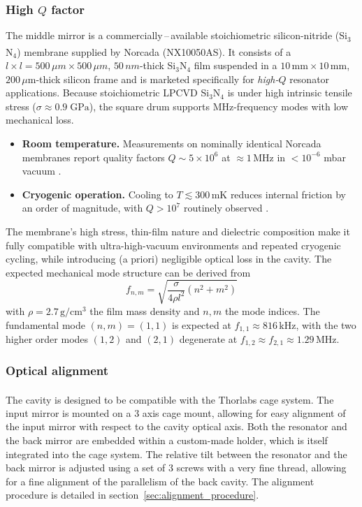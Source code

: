 \subsubsection{High $Q$ factor}

The middle mirror is a commercially\,–\,available stoichiometric silicon-nitride
(Si$_3$N$_4$) membrane supplied by Norcada\textsuperscript{\textregistered} (NX10050AS)\cite{SiN_review,Norcada_datasheet}.
It consists of a $l \times l = 500\,\mu m\times500\,\mu m $, $50\,nm$-thick
Si$_3$N$_4$ film suspended in a $10\,\mathrm{mm}\times10\,\mathrm{mm}$,
$200\,\mu\mathrm{m}$-thick silicon frame and is marketed specifically for
\emph{high-$Q$} resonator applications. Because stoichiometric LPCVD Si$_3$N$_4$ is under high intrinsic tensile
stress ($\sigma\!\approx\!0.9\;\mathrm{GPa}$), the square drum supports
MHz-frequency modes with low mechanical loss\cite{SiN_review}.

\begin{itemize}
  \item \textbf{Room temperature.}  Measurements on nominally identical
        Norcada membranes report quality factors
        $Q \sim 5\times10^{6}$ at $\approx1\,\mathrm{MHz}$ in
        $<10^{-6}$ mbar vacuum \cite{SiN_review,Norcada_datasheet}.
  \item \textbf{Cryogenic operation.}  Cooling to $T \lesssim 300\,\mathrm{mK}$
        reduces internal friction by an order of magnitude, with
        $Q>10^{7}$ routinely observed \cite{SiN_cryogenic}.
\end{itemize}

The membrane’s high stress, thin-film nature and dielectric composition make
it fully compatible with ultra-high-vacuum environments and repeated
cryogenic cycling, while introducing (a priori) negligible optical loss in the cavity.
The expected mechanical mode structure can be derived from 
\begin{equation}
f_{n,m}= \sqrt{\dfrac{\sigma}{4\rho l^2}(n^2+m^2)}
\end{equation}
with $\rho= 2.7 \,\mathrm{g/cm^3}$ the film mass density and $n,m$ the mode indices. The fundamental mode $(n,m)=(1,1)$ is expected at $f_{1,1} \approx 816\,\mathrm{kHz}$, with the two higher order modes $(1,2)$ and $(2,1)$ degenerate at $f_{1,2}\approx f_{2,1} \approx 1.29\,\mathrm{MHz}$.

\subsubsection{Optical alignment}
The cavity is designed to be compatible with the Thorlabs\textsuperscript{\textregistered} cage system. The input mirror is mounted on a 3 axis cage mount, allowing for easy alignment of the input mirror with respect to the cavity optical axis. Both the resonator and the back mirror are embedded within a custom-made holder, which is itself integrated into the cage system. The relative tilt between the resonator and the back mirror is adjusted using a set of 3 screws with a very fine thread, allowing for a fine alignment of the parallelism of the back cavity. The alignment procedure is detailed in section~\ref{sec:alignment_procedure}.

